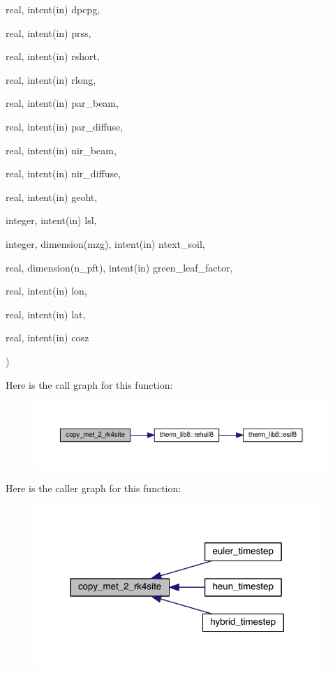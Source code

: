 {\begin{DoxyParamCaption}
\item[{real, intent(in)}]{dpcpg, }
\item[{real, intent(in)}]{prss, }
\item[{real, intent(in)}]{rshort, }
\item[{real, intent(in)}]{rlong, }
\item[{real, intent(in)}]{par\+\_\+beam, }
\item[{real, intent(in)}]{par\+\_\+diffuse, }
\item[{real, intent(in)}]{nir\+\_\+beam, }
\item[{real, intent(in)}]{nir\+\_\+diffuse, }
\item[{real, intent(in)}]{geoht, }
\item[{integer, intent(in)}]{lsl, }
\item[{integer, dimension(mzg), intent(in)}]{ntext\+\_\+soil, }
\item[{real, dimension(n\+\_\+pft), intent(in)}]{green\+\_\+leaf\+\_\+factor, }
\item[{real, intent(in)}]{lon, }
\item[{real, intent(in)}]{lat, }
\item[{real, intent(in)}]{cosz}
\end{DoxyParamCaption}
)}\label{rk4__integ__utils_8f90_a1c1388f3894670e417eb8e6f30414ec1}


Here is the call graph for this function\+:\nopagebreak
\begin{figure}[H]
\begin{center}
\leavevmode
\includegraphics[width=350pt]{rk4__integ__utils_8f90_a1c1388f3894670e417eb8e6f30414ec1_cgraph}
\end{center}
\end{figure}




Here is the caller graph for this function\+:\nopagebreak
\begin{figure}[H]
\begin{center}
\leavevmode
\includegraphics[width=309pt]{rk4__integ__utils_8f90_a1c1388f3894670e417eb8e6f30414ec1_icgraph}
\end{center}
\end{figure}


